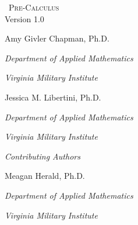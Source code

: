 
\hskip 125pt\begin{minipage}{\textwidth}
\begin{flushright}

\textsc{\large \apex\ {\Huge Pre-Calculus}} \\

{\small Version 1.0}\\

\Large
\vspace{1in}

Amy Givler Chapman, Ph.D.

\emph{\small Department of Applied Mathematics}

\emph{\small Virginia Military Institute}\vskip15pt

Jessica M. Libertini, Ph.D.

\emph{\small Department of Applied Mathematics}

\emph{\small Virginia Military Institute}\vskip15pt


\parbox{200pt}{\textit{Contributing Authors}}\hskip 2cm \phantom{.}

Meagan Herald, Ph.D.

\emph{\small Department of Applied Mathematics}

\emph{\small Virginia Military Institute}\vskip 15pt

%
%
%
%
%
%
%
%
%

\normalsize
\end{flushright}
\end{minipage}

